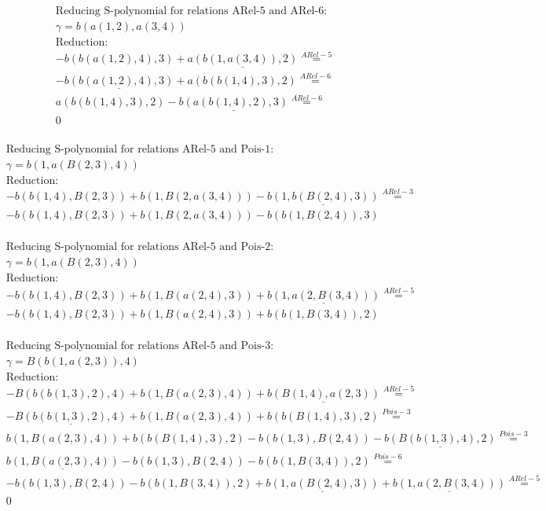 \documentclass[11pt]{amsart}
\begin{document}
\begin{align*} 
& \text{Reducing S-polynomial for relations ARel-5 and ARel-6:} \\ 
& \gamma = b(a(1,2),a(3,4)) \\ 
& \text{Reduction}: \\& - b(b(a(1,2),4),3) + \underline{a(b(1,a(3,4)),2)} \stackrel{ ARel-5 }{=}  \\ 
& - \underline{b(b(a(1,2),4),3)} + a(b(b(1,4),3),2) \stackrel{ ARel-6 }{=}  \\ 
&a(b(b(1,4),3),2) - \underline{b(a(b(1,4),2),3)} \stackrel{ ARel-6 }{=}  \\ 
&0\\ 
\end{align*} 
 
\begin{align*} 
& \text{Reducing S-polynomial for relations ARel-5 and Pois-1:} \\ 
& \gamma = b(1,a(B(2,3),4)) \\ 
& \text{Reduction}: \\& - b(b(1,4),B(2,3)) + b(1,B(2,a(3,4))) - \underline{b(1,b(B(2,4),3))} \stackrel{ ARel-3 }{=}  \\ 
& - b(b(1,4),B(2,3)) + b(1,B(2,a(3,4))) - b(b(1,B(2,4)),3)\\ 
\end{align*} 
 
\begin{align*} 
& \text{Reducing S-polynomial for relations ARel-5 and Pois-2:} \\ 
& \gamma = b(1,a(B(2,3),4)) \\ 
& \text{Reduction}: \\& - b(b(1,4),B(2,3)) + b(1,B(a(2,4),3)) + \underline{b(1,a(2,B(3,4)))} \stackrel{ ARel-5 }{=}  \\ 
& - b(b(1,4),B(2,3)) + b(1,B(a(2,4),3)) + b(b(1,B(3,4)),2)\\ 
\end{align*} 
 
\begin{align*} 
& \text{Reducing S-polynomial for relations ARel-5 and Pois-3:} \\ 
& \gamma = B(b(1,a(2,3)),4) \\ 
& \text{Reduction}: \\& - B(b(b(1,3),2),4) + b(1,B(a(2,3),4)) + \underline{b(B(1,4),a(2,3))} \stackrel{ ARel-5 }{=}  \\ 
& - \underline{B(b(b(1,3),2),4)} + b(1,B(a(2,3),4)) + b(b(B(1,4),3),2) \stackrel{ Pois-3 }{=}  \\ 
&b(1,B(a(2,3),4)) + b(b(B(1,4),3),2) - b(b(1,3),B(2,4)) - \underline{b(B(b(1,3),4),2)} \stackrel{ Pois-3 }{=}  \\ 
&\underline{b(1,B(a(2,3),4))} - b(b(1,3),B(2,4)) - b(b(1,B(3,4)),2) \stackrel{ Pois-6 }{=}  \\ 
& - b(b(1,3),B(2,4)) - b(b(1,B(3,4)),2) + \underline{b(1,a(B(2,4),3))} + \underline{b(1,a(2,B(3,4)))} \stackrel{ ARel-5 }{=}  \\ 
&0\\ 
\end{align*} 
 
\end{document}
